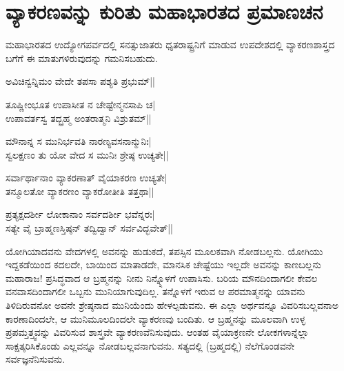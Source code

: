 \section*{ವ್ಯಾಕರಣವನ್ನು ಕುರಿತು ಮಹಾಭಾರತದ ಪ್ರಮಾಣಚನ}

ಮಹಾಭಾರತದ ಉದ್ಯೋಗಪರ್ವದಲ್ಲಿ ಸನತ್ಸುಜಾತರು ಧೃತರಾಷ್ಟ್ರನಿಗೆ ಮಾಡುವ ಉಪದೇಶದಲ್ಲಿ ವ್ಯಾಕರಣಶಾಸ್ತ್ರದ ಬಗೆಗೆ ಈ ಮಾತುಗಳಿರುವುದನ್ನು ಗಮನಿಸಬಹುದು.

\begin{shloka}
ಅವಿಚಿನ್ವನ್ನಿಮಂ ವೇದೇ ತಪಸಾ ಪಶ್ಯತಿ ಪ್ರಭುಮ್||
\end{shloka}

\begin{shloka}
ತೂಷ್ಣೀಂಭೂತ ಉಪಾಸೀತ ನ ಚೇಷ್ಟೇನ್ಮನಸಾಪಿ ಚ|\\
ಉಪಾವರ್ತಸ್ವ ತದ್ಬ್ರಹ್ಮ ಅಂತರಾತ್ಮನಿ ವಿಶ್ರುತಮ್||
\end{shloka}

\begin{shloka}
ಮೌನಾನ್ನ ಸ ಮುನಿರ್ಭವತಿ ನಾರಣ್ಯವಸನಾನ್ಮುನಿಃ|\\
ಸ್ವಲಕ್ಷಣಂ ತು ಯೋ ವೇದ ಸ ಮುನಿಃ ಶ್ರೇಷ್ಠ ಉಚ್ಯತೇ||
\end{shloka}

\begin{shloka}
ಸರ್ವಾರ್ಥಾನಾಂ ವ್ಯಾಕರಣಾತ್ ವೈಯಾಕರಣ ಉಚ್ಯತೇ|\\
ತನ್ಮೂಲತೋ ವ್ಯಾಕರಣಂ ವ್ಯಾಕರೋತೀತಿ ತತ್ತಥಾ||
\end{shloka}

\begin{shloka}
ಪ್ರತ್ಯಕ್ಷದರ್ಶೀ ಲೋಕಾನಾಂ ಸರ್ವದರ್ಶೀ ಭವೆನ್ನರಃ|\\
ಸತ್ಯೇ ವೈ ಬ್ರಾಹ್ಮಣಸ್ತಿಷ್ಠನ್ ತದ್ವಿದ್ವಾನ್ ಸರ್ವವಿದ್ಭವೇತ್||
\end{shloka}

ಯೋಗಿಯಾದವನು ವೇದಗಳಲ್ಲಿ ಅವನನ್ನು ಹುಡುಕದೆ, ತಪಸ್ಸಿನ ಮೂಲಕವಾಗಿ ನೋಡಬಲ್ಲನು. ಯೋಗಿಯು ಇದ್ದಕಡೆಯಿಂದ ಕದಲದೇ, ಬಾಯಿಂದ ಮಾತಾಡದೇ, ಮಾನಸಿಕ ಚೇಷ್ಟೆಯು ಇಲ್ಲದೇ ಅವನನ್ನು ಕಾಣಬಲ್ಲನು ಮಹಾರಾಜ! ಪ್ರಸಿದ್ಧವಾದ ಆ ಬ್ರಹ್ಮನನ್ನು ನೀನು ನಿನ್ನ್ನೊಳಗೆ ಉಪಾಸಿಸು. ಬರಿಯ ಮೌನದಿಂದಾಗಲೀ ಕೇವಲ ವನವಾಸದಿಂದಾಗಲೀ ಒಬ್ಬನು ಮುನಿಯಾಗುವುದಿಲ್ಲ. ತನ್ನೊಳಗೆ ಇರುವ ಆ ಪರಮಾತ್ಮನನ್ನು ಯಾವನು ತಿಳಿದಿರುವನೋ ಅವನೇ ಶ್ರೇಷ್ಠನಾದ ಮುನಿಯೆಂದು ಹೇಳಲ್ಪಡುವನು. ಈ ಎಲ್ಲಾ ಅರ್ಥವನ್ನೂ ವಿವರಿಸಬಲ್ಲವನಾಅ ಕಾರಣಾದಿಂದಲೇ, ಆ ಮುನಿಮೂಲದಿಂದಲೇ ವ್ಯಾಕರಣವು ಬಂದಿತು. ಆ ಬ್ರಹ್ಮನನ್ನು ಮೂಲವಾಗಿ ಉಳ್ಳ ಪ್ರಪಮ್ತತ್ತ್ವವನ್ನು ವಿವರಿಸುವ ಶಾಸ್ತ್ರವೇ ವ್ಯಾಕರಣವೆನಿಸುವುದು. ಆಂತಹ ವೈಯಾಕ್ರಣನೇ ಲೋಕಗಳಾನ್ನೆಲ್ಲಾ ಸಾಕ್ಷತ್ಕರಿಸಿಕೊಂಡು ಎಲ್ಲವನ್ನೂ ನೋಡಬಲ್ಲವನಾಗುವನು. ಸತ್ಯದಲ್ಲಿ (ಬ್ರಹ್ಮದಲ್ಲಿ) ನೆಲೆಗೊಂಡವನೇ ಸರ್ವಜ್ಞನೆನಿಸುವನು.
